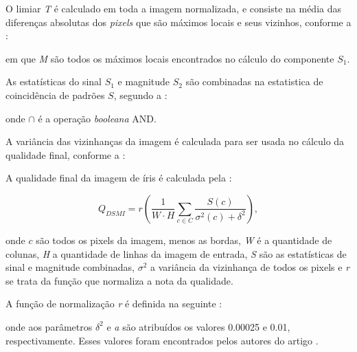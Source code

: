 \noindent O limiar \textit{T} é calculado em toda a imagem normalizada, e consiste na média das diferenças absolutas dos \textit{pixels} que são máximos locais e seus vizinhos, conforme a  \cite{Jenadeleh_2018_CVPR_Workshops}:


\noindent em que \textit{M} são todos os máximos locais encontrados no cálculo do componente $S_{1}$.

\par As estatísticas do sinal \textit{$S_{1}$} e magnitude \textit{$S_{2}$} são combinadas na estatistica de coincidência de padrões $S$, segundo a  \cite{Jenadeleh_2018_CVPR_Workshops}:


\noindent onde $\cap$ é a operação \textit{booleana} AND.

\par A variância das vizinhanças da imagem é calculada para ser usada no cálculo da qualidade final, conforme a  \cite{Jenadeleh_2018_CVPR_Workshops}:



\par A qualidade final da imagem de íris é calculada pela  \cite{Jenadeleh_2018_CVPR_Workshops}:

\begin{equation}\label{eq:dsmi:Q}
  Q_{DSMI} = r(\frac{1}{W\cdot H}\sum_{c \in C}\frac{S(c)}{\sigma^2(c) + \delta^2}),
\end{equation}

\noindent onde $c$ são todos os pixels da imagem, menos as bordas, \textit{W} é a quantidade de colunas, \textit{H} a quantidade de linhas da imagem de entrada, \textit{S} são as estatísticas de sinal e magnitude combinadas, $\sigma^{2}$ a variância da vizinhança de todos os pixels e \textit{r} se trata da função que normaliza a nota da qualidade.

\par A função de normalização \textit{r} é definida na seguinte  \cite{Jenadeleh_2018_CVPR_Workshops}:

\equacao{eq:dsmi:r}{
    r : [0, \infty) \to [0, 1) \quad x \mapsto 1 - e^{-ax},
}

\noindent onde aos parâmetros $\delta^2$ e \textit{a} são atribuídos os valores 0.00025 e 0.01, respectivamente. Esses valores foram encontrados pelos autores do artigo \cite{Jenadeleh_2018_CVPR_Workshops}.

